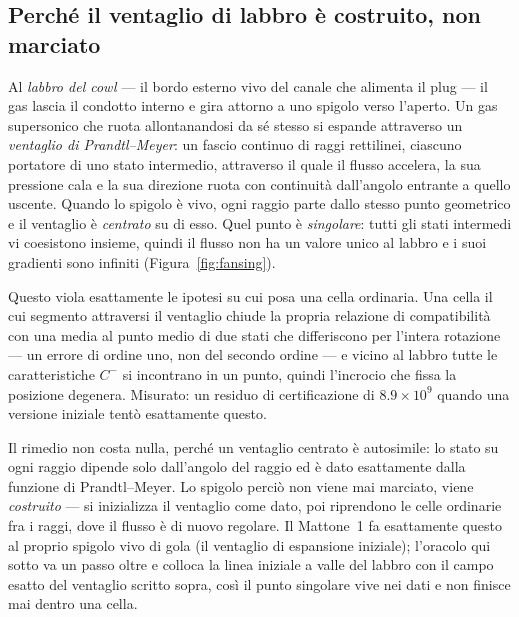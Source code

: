 \subsection{Perché il ventaglio di labbro è costruito, non marciato}

Al \emph{labbro del cowl} --- il bordo esterno vivo del canale che
alimenta il plug --- il gas lascia il condotto interno e gira attorno
a uno spigolo verso l'aperto. Un gas supersonico che ruota
allontanandosi da sé stesso si espande attraverso un \emph{ventaglio
di Prandtl--Meyer}: un fascio continuo di raggi rettilinei, ciascuno
portatore di uno stato intermedio, attraverso il quale il flusso
accelera, la sua pressione cala e la sua direzione ruota con
continuità dall'angolo entrante a quello uscente. Quando lo spigolo
è vivo, ogni raggio parte dallo stesso punto geometrico e il
ventaglio è \emph{centrato} su di esso. Quel punto è
\emph{singolare}: tutti gli stati intermedi vi coesistono insieme,
quindi il flusso non ha un valore unico al labbro e i suoi gradienti
sono infiniti (Figura~\ref{fig:fansing}).

Questo viola esattamente le ipotesi su cui posa una cella ordinaria.
Una cella il cui segmento attraversi il ventaglio chiude la propria
relazione di compatibilità con una media al punto medio di due stati
che differiscono per l'intera rotazione --- un errore di ordine uno,
non del secondo ordine --- e vicino al labbro tutte le
caratteristiche $C^{-}$ si incontrano in un punto, quindi l'incrocio
che fissa la posizione degenera. Misurato: un residuo di
certificazione di $8.9\times10^{9}$ quando una versione iniziale
tentò esattamente questo.

Il rimedio non costa nulla, perché un ventaglio centrato è
autosimile: lo stato su ogni raggio dipende solo dall'angolo del
raggio ed è dato esattamente dalla funzione di Prandtl--Meyer. Lo
spigolo perciò non viene mai marciato, viene \emph{costruito} --- si
inizializza il ventaglio come dato, poi riprendono le celle
ordinarie fra i raggi, dove il flusso è di nuovo regolare. Il
Mattone~1 fa esattamente questo al proprio spigolo vivo di gola (il
ventaglio di espansione iniziale); l'oracolo qui sotto va un passo
oltre e colloca la linea iniziale a valle del labbro con il campo
esatto del ventaglio scritto sopra, così il punto singolare vive nei
dati e non finisce mai dentro una cella.

